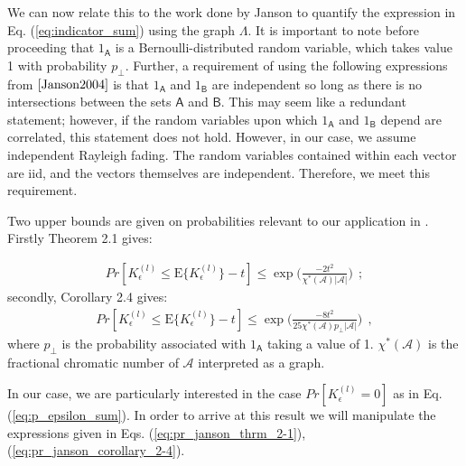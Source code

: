 We can now relate this to the work done by Janson \cite{Janson2004} to quantify the expression in Eq. (\ref{eq:indicator_sum}) using the graph $\Lambda$. It is important to note before proceeding that $1_\mathsf{A}$ is a Bernoulli-distributed random variable, which takes value 1 with probability $p_\perp$. Further, a requirement of using the following expressions from $\cite{Janson2004}$ is that $1_\mathsf{A}$ and $1_\mathsf{B}$ are independent so long as there is no intersections between the sets $\mathsf{A}$ and $\mathsf{B}$. This may seem like a redundant statement; however, if the random variables upon which $1_\mathsf{A}$ and $1_\mathsf{B}$ depend are correlated, this statement does not hold. However, in our case, we assume independent Rayleigh fading. The random variables contained within each vector are iid, and the vectors themselves are independent. Therefore, we meet this requirement.

Two upper bounds are given on probabilities relevant to our application in \cite{Janson2004}. Firstly Theorem 2.1 gives:

 \begin{equation}\label{eq:pr_janson_thrm_2-1}
    \begin{aligned}
        Pr[K_\epsilon^{(l)} \leq \text{E}\lbrace K_\epsilon^{(l)} \rbrace -t] \leq \exp\bigg(\frac{-2t^2}{\chi^*(\mathscr{A})\vert \mathscr{A}\vert}\bigg) \ \ ;
    \end{aligned}
\end{equation}
secondly, Corollary 2.4 gives:
\begin{equation}\label{eq:pr_janson_corollary_2-4}
    \begin{aligned}
        Pr[K_\epsilon^{(l)} \leq \text{E}\lbrace K_\epsilon^{(l)} \rbrace -t] \leq \exp\bigg(\frac{-8t^2}{25\chi^*(\mathscr{A})p_\perp\vert \mathscr{A}\vert}\bigg) \ \ ,
    \end{aligned}
\end{equation}
where $p_\perp$ is the probability associated with $1_\mathsf{A}$ taking a value of 1. $\chi^*(\mathscr{A})$ is the fractional chromatic number of $\mathscr{A}$ interpreted as a graph.

In our case, we are particularly interested in the case $Pr[K_\epsilon^{(l)} = 0]$ as in Eq. (\ref{eq:p_epsilon_sum}). In order to arrive at this result we will manipulate the expressions given in Eqs. (\ref{eq:pr_janson_thrm_2-1}),(\ref{eq:pr_janson_corollary_2-4}). 


